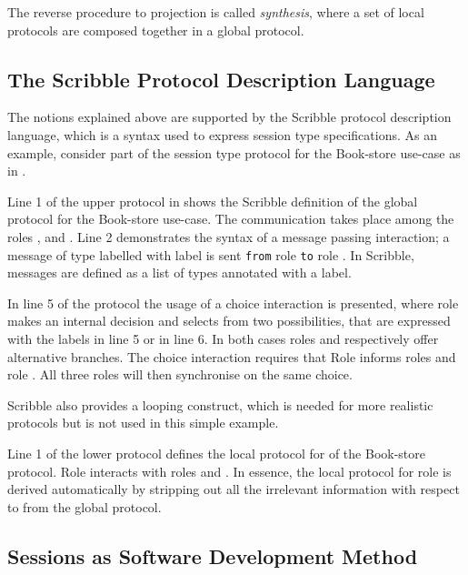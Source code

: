 The reverse procedure to projection is called {\em synthesis},
where a set of local protocols are composed together in a global
protocol.

\subsection{The Scribble Protocol Description Language}
\label{sec:scribble}
The notions explained above are supported by the
Scribble protocol description language,
which is a syntax used to express session type specifications.
As an example,
consider part of the session type protocol for the Book-store
use-case as in . 




Line 1 of the upper protocol in  shows the
Scribble definition of the global protocol for the Book-store use-case.
The communication takes place
among the roles \BuyerOne, \BuyerTwo and \Seller. Line 2 demonstrates
the syntax of a message passing interaction; a message
of type  labelled with label  is sent \lstinline|from|
role \BuyerOne \lstinline|to| role \Seller. In Scribble, messages are
defined as a list of types annotated with a label.

In line 5 of the protocol 
the usage of a choice interaction is presented,
where role \BuyerTwo makes an internal decision and selects
from two possibilities, that are
expressed with the labels  in line 5 or  in line 6.
In  both cases roles \BuyerOne and \Seller respectively offer
alternative branches. The choice interaction requires that
Role \BuyerTwo informs roles \BuyerOne and role \Seller. All
three roles will then synchronise on the same choice.

Scribble also provides a looping construct, which is needed for more realistic protocols but is not used in this simple example.


Line 1 of the lower protocol defines the local protocol 
for \BuyerOne of the Book-store protocol. Role \BuyerOne
interacts with roles \BuyerTwo and \Seller. In essence,
the local protocol for role \BuyerOne is derived automatically
by stripping out all the irrelevant information with respect
to \BuyerOne from the global protocol.

\subsection{Sessions as Software Development Method}%
\label{sec:sessions_integrate}

